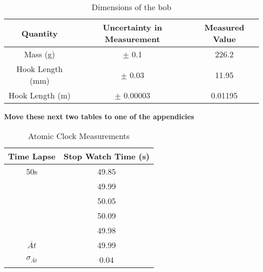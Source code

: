 \documentclass[iop]{emulateapj}
\begin{document}
\begin{table}[H]
\caption{Dimensions of the bob} %
\centering %
\begin{tabular}{c c c} %
\hline\hline %
Quantity & Uncertainty in Measurement & Measured Value\\ [0.5ex]
\hline %
Mass (g) & $\pm$ 0.1 & 226.2\\ %
Hook Length (mm)& $\pm$ 0.03 & 11.95\\
Hook Length (m)& $\pm$ 0.00003 & 0.01195\\[1ex] %
\hline %
\end{tabular}
\label{tab:hresult}
\end{table}


{\bf Move these next two tables to one of the appendicies}

\begin{table}[H]
\caption{Atomic Clock Measurements} %
\centering %
\begin{tabular}{c c} %
\hline\hline %
Time Lapse & Stop Watch Time (s) \\ [0.5ex] %
\hline %
50s & 49.85 \\ %
    & 49.99 \\
    & 50.05 \\
    & 50.09 \\
    & 49.98 \\
$\overline{At}$ & 49.99 \\
$\sigma_{\overline{At}}$ & 0.04 \\    [1ex] %
\hline %
\end{tabular}
\label{table:nonlin} %
\end{table}
\end{document}
